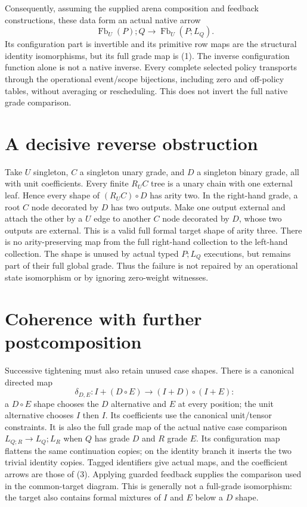 \documentclass{article}
\begin{document}
Consequently, assuming the supplied arena composition and feedback
constructions, these data form an actual native arrow
\[
 \operatorname{Fb}_U(P);Q\longrightarrow
 \operatorname{Fb}_U(P;L_Q). \tag{2}
\]
Its configuration part is invertible and its primitive row maps are the
structural identity isomorphisms, but its full grade map is (1).
The inverse configuration function alone is not a native inverse. Every
complete selected policy transports through the operational event/scope
bijections, including zero and off-policy tables, without averaging or
rescheduling. This does not invert the full native grade comparison.

\section{A decisive reverse obstruction}
Take $U$ singleton, $C$ a singleton unary grade, and $D$ a singleton binary
grade, all with unit coefficients. Every finite $R_UC$ tree is a unary chain
with one external leaf. Hence every shape of $(R_UC)\circ D$ has arity two.
In the right-hand grade, a root $C$ node decorated by $D$ has two outputs.
Make one output external and attach the other by a $U$ edge to another
$C$ node decorated by $D$, whose two outputs are external. This is a valid
full formal target shape of arity three. There is no arity-preserving map
from the full right-hand collection to the left-hand collection. The shape
is unused by actual typed $P;L_Q$ executions, but remains part of their full
global grade. Thus the failure is not repaired by an operational state
isomorphism or by ignoring zero-weight witnesses.

\section{Coherence with further postcomposition}
Successive tightening must also retain unused case shapes. There is a
canonical directed map
\[
 \delta_{D,E}:I+(D\circ E)\longrightarrow
 (I+D)\circ(I+E): \tag{3}
\]
a $D\circ E$ shape chooses the $D$ alternative and $E$ at every position;
the unit alternative chooses $I$ then $I$. Its coefficients use the canonical
unit/tensor constraints. It is also the full grade map of the actual native case comparison
$L_{Q;R}\to L_Q;L_R$ when $Q$ has grade $D$ and $R$ grade $E$.
Its configuration map flattens the same continuation copies; on the identity
branch it inserts the two trivial identity copies. Tagged identifiers give
actual maps, and the coefficient arrows are those of (3). Applying guarded
feedback supplies the comparison used in the common-target diagram.
This is generally not a full-grade isomorphism:
the target also contains formal mixtures of $I$ and $E$ below a $D$ shape.
\end{document}
